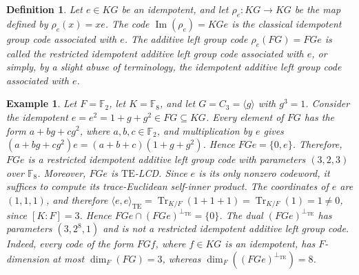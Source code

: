 \documentclass[11pt]{article}
\newtheorem{definition}[theorem]{Definition}
\newtheorem{example}[theorem]{Example}
\begin{document}
\begin{definition}\label{def:restricted-idempotent}
Let $e\in KG$ be an idempotent, and let
$\rho_e:KG\longrightarrow KG$ be the map defined by $\rho_e(x)=xe$. The
code $\operatorname{Im}(\rho_e)=KGe$ is the classical
\textit{idempotent group code} associated with $e$. The additive left group
code $\rho_e(FG)=FGe$ is called the \textit{restricted idempotent additive
left group code} associated with $e$, or simply, by a slight abuse of
terminology, the \textit{idempotent additive left group code} associated with
$e$.
\end{definition}

\begin{example}\label{ex:restricted-idempotent-basic}
Let $F=\mathbb{F}_2$, let $K=\mathbb{F}_8$, and let
$G=C_3=\langle g\rangle$ with $g^3=1$. Consider the idempotent
$e=e^2=1+g+g^2\in FG\subseteq KG$. Every element of $FG$ has the form $a+bg+cg^2$, where
$a,b,c\in\mathbb{F}_2$, and multiplication by $e$ gives
$(a+bg+cg^2)e=(a+b+c)(1+g+g^2)$. Hence $FGe=\{0,e\}$. Therefore, $FGe$ is a
restricted idempotent additive left group code with parameters $(3,2,3)$ over
$\mathbb{F}_8$. Moreover, $FGe$ is $\mathrm{TE}$-LCD. Since $e$ is its only nonzero
codeword, it suffices to compute its trace-Euclidean self-inner product. The
coordinates of $e$ are $(1,1,1)$, and therefore
$\langle e,e\rangle_{\mathrm{TE}}=\operatorname{Tr}_{K/F}(1+1+1)
=\operatorname{Tr}_{K/F}(1)=1\neq 0$, since $[K:F]=3$. Hence
$FGe\cap(FGe)^{\perp_{\mathrm{TE}}}=\{0\}$. The dual
$(FGe)^{\perp_{\mathrm{TE}}}$ has parameters $(3,2^8,1)$ and is not a
restricted idempotent additive left group code. Indeed, every code of the
form $FGf$, where $f\in KG$ is an idempotent, has $F$-dimension at most
$\dim_F(FG)=3$, whereas
$\dim_F((FGe)^{\perp_{\mathrm{TE}}})=8$.
\end{example}
\end{document}
